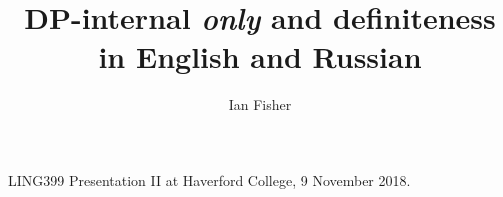 \documentclass{article}
\title{DP-internal \textit{only} and definiteness in English and Russian}
\author{Ian Fisher}
\date{}
\begin{document}
\maketitle

\noindent LING399 Presentation II at Haverford College, 9 November 2018.


\end{document}
